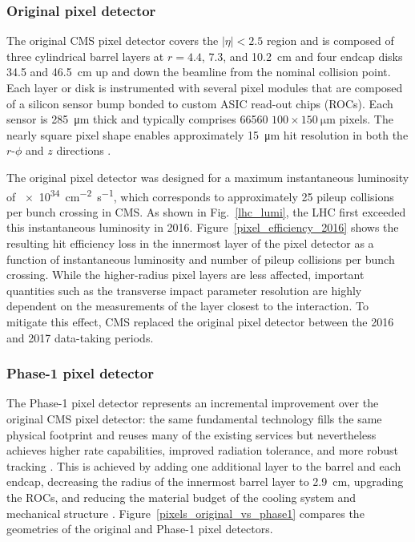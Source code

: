 \subsubsection{Original pixel detector}
The original CMS pixel detector covers the $|\eta|<2.5$ region and is composed of three cylindrical barrel layers at $r=4.4$, $7.3$, and \SI{10.2}{\cm} and four endcap disks \num{34.5} and \SI{46.5}{\cm} up and down the beamline from the nominal collision point. Each layer or disk is instrumented with several pixel modules that are composed of a silicon sensor bump bonded to custom ASIC read-out chips (ROCs). Each sensor is \SI{285}{\um} thick and typically comprises \num{66560} $100\times\SI{150}{\um}$ pixels. The nearly square pixel shape enables approximately \SI{15}{\um} hit resolution in both the $r$-$\phi$ and $z$ directions \cite{cms_tdr_v1, cms_experiment}.


The original pixel detector was designed for a maximum instantaneous luminosity of \SI{e34}{\cm\tothe{-2}\s\tothe{-1}}, which corresponds to approximately 25 pileup collisions per bunch crossing in CMS. As shown in Fig.~\ref{lhc_lumi}, the LHC first exceeded this instantaneous luminosity in 2016. Figure~\ref{pixel_efficiency_2016} shows the resulting hit efficiency loss in the innermost layer of the pixel detector as a function of instantaneous luminosity and number of pileup collisions per bunch crossing. While the higher-radius pixel layers are less affected, important quantities such as the transverse impact parameter resolution are highly dependent on the measurements of the layer closest to the interaction. To mitigate this effect, CMS replaced the original pixel detector between the 2016 and 2017 data-taking periods. 



\subsubsection{Phase-1 pixel detector}
The Phase-1 pixel detector represents an incremental improvement over the original CMS pixel detector: the same fundamental technology fills the same physical footprint and reuses many of the existing services but nevertheless achieves higher rate capabilities, improved radiation tolerance, and more robust tracking \cite{cms_phase1_pixels}. This is achieved by adding one additional layer to the barrel and each endcap, decreasing the radius of the innermost barrel layer to \SI{2.9}{\cm}, upgrading the ROCs, and reducing the material budget of the cooling system and mechanical structure \cite{cms_phase1_pixels, cms_phase1_pixel_tdr}. Figure~\ref{pixels_original_vs_phase1} compares the geometries of the original and Phase-1 pixel detectors.

